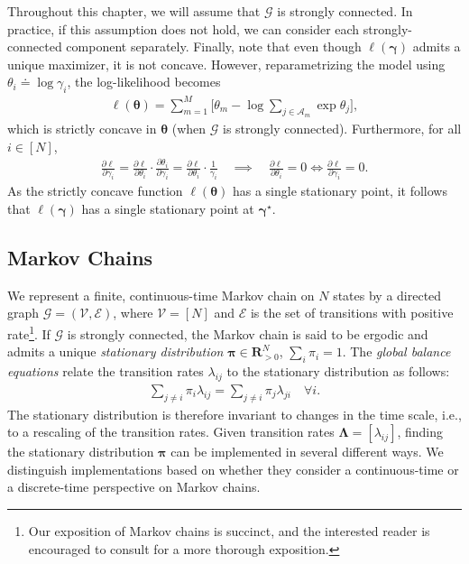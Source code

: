 Throughout this chapter, we will assume that $\mathcal{G}$ is strongly connected.
In practice, if this assumption does not hold, we can consider each strongly-connected component separately.
Finally, note that even though $\ell(\bm{\gamma})$ admits a unique maximizer, it is not concave.
However, reparametrizing the model using $\theta_i \doteq \log \gamma_i$, the log-likelihood becomes
\begin{align*}
\ell(\bm{\theta}) = \sum_{m = 1}^M \bigg[ \theta_m - \log{\sum_{j \in \mathcal{A}_m} \exp \theta_j} \bigg],
\end{align*}
which is strictly concave in $\bm{\theta}$ (when $\mathcal{G}$ is strongly connected).
Furthermore, for all $i \in [N]$,
\begin{align*}
\frac{\partial \ell}{\partial \gamma_i}
  = \frac{\partial \ell}{\partial \theta_i} \cdot \frac{\partial \theta_i}{\partial \gamma_i}
  = \frac{\partial \ell}{\partial \theta_i} \cdot \frac{1}{\gamma_i}
\quad \implies \quad
\frac{\partial \ell}{\partial \theta_i} = 0 \iff \frac{\partial \ell}{\partial \gamma_i} = 0.
\end{align*}
As the strictly concave function $\ell({\bm{\theta}})$ has a single stationary point, it follows that $\ell(\bm{\gamma})$ has a single stationary point at $\bm{\gamma}^\star$.


\subsection{Markov Chains}

We represent a finite, continuous-time Markov chain on $N$ states by a directed graph $\mathcal{G} = (\mathcal{V}, \mathcal{E})$, where $\mathcal{V} = [N]$ and $\mathcal{E}$ is the set of transitions with positive rate\footnote{%
Our exposition of Markov chains is succinct, and the interested reader is encouraged to consult \citet{levin2008markov} for a more thorough exposition.}.
If $\mathcal{G}$ is strongly connected, the Markov chain is said to be ergodic and admits a unique \emph{stationary distribution} $\bm{\pi} \in \mathbf{R}^N_{>0}$, $\sum_i \pi_i = 1$.
The \emph{global balance equations} relate the transition rates $\lambda_{ij}$ to the stationary distribution as follows:
\begin{align}
\label{fi:eq:balance}
\sum_{j \ne i} \pi_i \lambda_{ij} = \sum_{j \ne i} \pi_j \lambda_{ji} \quad \forall i.
\end{align}
The stationary distribution is therefore invariant to changes in the time scale, i.e., to a rescaling of the transition rates.
Given transition rates $\bm{\Lambda} = [\lambda_{ij}]$, finding the stationary distribution $\bm{\pi}$ can be implemented in several different ways.
We distinguish implementations based on whether they consider a continuous-time or a discrete-time perspective on Markov chains.

